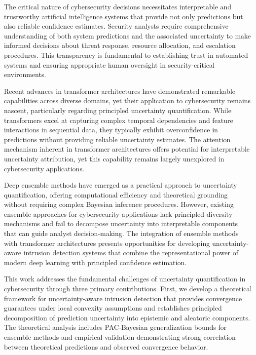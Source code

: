 \documentclass[journal]{IEEEtran}
\begin{document}
The critical nature of cybersecurity decisions necessitates interpretable and trustworthy artificial intelligence systems that provide not only predictions but also reliable confidence estimates. Security analysts require comprehensive understanding of both system predictions and the associated uncertainty to make informed decisions about threat response, resource allocation, and escalation procedures. This transparency is fundamental to establishing trust in automated systems and ensuring appropriate human oversight in security-critical environments.

Recent advances in transformer architectures have demonstrated remarkable capabilities across diverse domains, yet their application to cybersecurity remains nascent, particularly regarding principled uncertainty quantification. While transformers excel at capturing complex temporal dependencies and feature interactions in sequential data, they typically exhibit overconfidence in predictions without providing reliable uncertainty estimates. The attention mechanism inherent in transformer architectures offers potential for interpretable uncertainty attribution, yet this capability remains largely unexplored in cybersecurity applications.

Deep ensemble methods have emerged as a practical approach to uncertainty quantification, offering computational efficiency and theoretical grounding without requiring complex Bayesian inference procedures. However, existing ensemble approaches for cybersecurity applications lack principled diversity mechanisms and fail to decompose uncertainty into interpretable components that can guide analyst decision-making. The integration of ensemble methods with transformer architectures presents opportunities for developing uncertainty-aware intrusion detection systems that combine the representational power of modern deep learning with principled confidence estimation.

This work addresses the fundamental challenges of uncertainty quantification in cybersecurity through three primary contributions. First, we develop a theoretical framework for uncertainty-aware intrusion detection that provides convergence guarantees under local convexity assumptions and establishes principled decomposition of prediction uncertainty into epistemic and aleatoric components. The theoretical analysis includes PAC-Bayesian generalization bounds for ensemble methods and empirical validation demonstrating strong correlation between theoretical predictions and observed convergence behavior.
\end{document}
